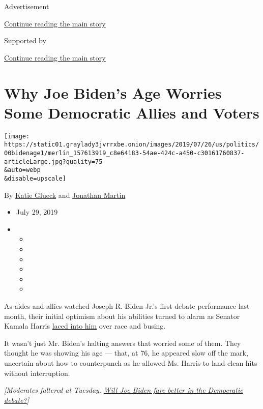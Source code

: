 Advertisement

\protect\hyperlink{after-top}{Continue reading the main story}

Supported by

\protect\hyperlink{after-sponsor}{Continue reading the main story}

\hypertarget{why-joe-bidens-age-worries-some-democratic-allies-and-voters}{%
\section{Why Joe Biden's Age Worries Some Democratic Allies and
Voters}\label{why-joe-bidens-age-worries-some-democratic-allies-and-voters}}

\texttt{[image: https://static01.graylady3jvrrxbe.onion/images/2019/07/26/us/politics/00bidenage1/merlin\_157613919\_c8e64183-54ae-424c-a450-c30161760837-articleLarge.jpg?quality=75\\\&auto=webp\\\&disable=upscale]}

By \href{https://www.nytimes3xbfgragh.onion/by/katie-glueck}{Katie
Glueck} and
\href{https://www.nytimes3xbfgragh.onion/by/jonathan-martin}{Jonathan
Martin}

\begin{itemize}
\item
  July 29, 2019
\item
  \begin{itemize}
  \item
  \item
  \item
  \item
  \item
  \item
  \end{itemize}
\end{itemize}

As aides and allies watched Joseph R. Biden Jr.'s first debate
performance last month, their initial optimism about his abilities
turned to alarm as Senator Kamala Harris
\href{https://www.nytimes3xbfgragh.onion/2019/06/27/us/politics/kamala-harris-joe-biden-busing.html}{laced
into him} over race and busing.

It wasn't just Mr. Biden's halting answers that worried some of them.
They thought he was showing his age --- that, at 76, he appeared slow
off the mark, uncertain about how to counterpunch as he allowed Ms.
Harris to land clean hits without interruption.

\emph{{[}Moderates faltered at Tuesday.}
\href{https://www.nytimes3xbfgragh.onion/2019/07/31/us/politics/debate-moderate-progressive-democrats.html}{\emph{Will
Joe Biden fare better in the Democratic debate?}}\emph{{]}}

